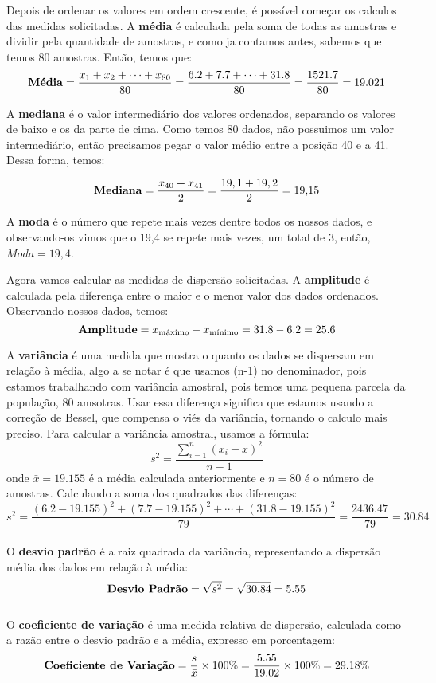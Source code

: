 \documentclass[a4paper,11pt]{article}
\begin{document}
Depois de ordenar os valores em ordem crescente, é possível começar os calculos das medidas solicitadas. A \textbf{média} é calculada pela soma de todas as amostras e dividir pela quantidade de amostras, e como ja contamos antes, sabemos que temos 80 amostras. Então, temos que:
\[
\text{\textbf{Média}} = \frac{x_1 + x_2 + \cdots + x_{80}}{80} =  \frac{6.2 + 7.7 + \cdots + 31.8}{80} =  \frac{1521.7}{80} = 19.021
\]

A \textbf{mediana} é o valor intermediário dos valores ordenados, separando os valores de baixo e os da parte de cima. Como temos 80 dados, não possuimos um valor intermediário, então precisamos pegar o valor médio entre a posição 40 e a 41. Dessa forma, temos:

\[
\text{\textbf{Mediana}} = \frac{x_{40} + x_{41}}{2} = \frac{19,1 + 19,2}{2} = 19{,}15
\] 

A \textbf{moda} é o número que repete mais vezes dentre todos os nossos dados, e observando-os vimos que o 19,4 se repete mais vezes, um total de 3, então, $Moda = 19,4$.

Agora vamos calcular as medidas de dispersão solicitadas. A \textbf{amplitude} é calculada pela diferença entre o maior e o menor valor dos dados ordenados. Observando nossos dados, temos:
\[
\text{\textbf{Amplitude}} = x_{\text{máximo}} - x_{\text{mínimo}} = 31.8 - 6.2 = 25.6
\]

A \textbf{variância} é uma medida que mostra o quanto os dados se dispersam em relação à média, algo a se notar é que usamos (n-1) no denominador, pois estamos trabalhando com variância amostral, pois temos uma pequena parcela da população, 80 amsotras. Usar essa diferença significa que estamos usando a correção de Bessel, que compensa o viés da variância, tornando o calculo mais preciso. Para calcular a variância amostral, usamos a fórmula:
\[
s^2 = \frac{\sum_{i=1}^{n} (x_i - \bar{x})^2}{n-1}
\]
onde $\bar{x} = 19.155$ é a média calculada anteriormente e $n = 80$ é o número de amostras. Calculando a soma dos quadrados das diferenças:
\[
s^2 = \frac{(6.2-19.155)^2 + (7.7-19.155)^2 + \cdots + (31.8-19.155)^2}{79} = \frac{2436.47}{79} = 30.84
\]
\\

O \textbf{desvio padrão} é a raiz quadrada da variância, representando a dispersão média dos dados em relação à média:
\[
\text{\textbf{Desvio Padrão}} = \sqrt{s^2} = \sqrt{30.84} = 5.55
\]
\\

O \textbf{coeficiente de variação} é uma medida relativa de dispersão, calculada como a razão entre o desvio padrão e a média, expresso em porcentagem:
\[
\text{\textbf{Coeficiente de Variação}} = \frac{s}{\bar{x}} \times 100\% = \frac{5.55}{19.02} \times 100\% = 29.18\%
\]
\\
\end{document}
